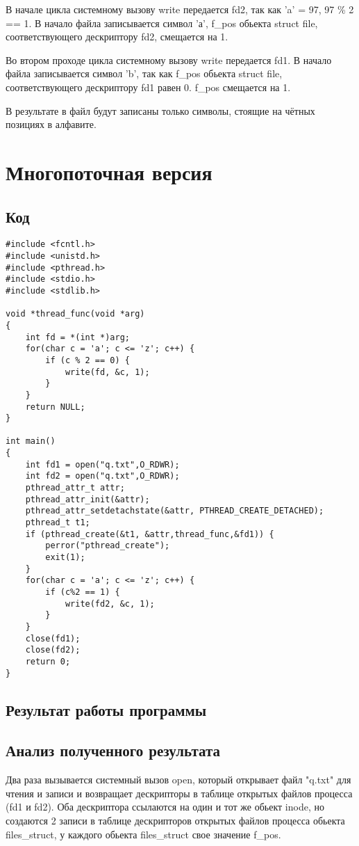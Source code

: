 В начале цикла системному вызову write передается fd2, так как 'a' = 97, 97 \% 2 == 1. В начало файла записывается символ 'а', f\_pos обьекта struct file, соответствующего дескриптору fd2, смещается на 1.

Во втором проходе цикла системному вызову write передается fd1. В начало файла записывается символ 'b', так как f\_pos обьекта struct file, соответствующего дескриптору fd1 равен 0. f\_pos смещается на 1.

В результате в файл будут записаны только символы, стоящие на чётных позициях в алфавите.

\section{Многопоточная версия}
\subsection{Код}
\begin{lstlisting}[caption={Программа 2, вариант 2, многопоточная версия}, label=lst:p22_th]
#include <fcntl.h>
#include <unistd.h>
#include <pthread.h>
#include <stdio.h>
#include <stdlib.h>

void *thread_func(void *arg)
{
	int fd = *(int *)arg;
	for(char c = 'a'; c <= 'z'; c++) {
		if (c % 2 == 0) {
			write(fd, &c, 1);
		}
	}
	return NULL;
}

int main() 
{
	int fd1 = open("q.txt",O_RDWR);
	int fd2 = open("q.txt",O_RDWR);
	pthread_attr_t attr;
	pthread_attr_init(&attr);
	pthread_attr_setdetachstate(&attr, PTHREAD_CREATE_DETACHED);
	pthread_t t1;
	if (pthread_create(&t1, &attr,thread_func,&fd1)) {
		perror("pthread_create");
		exit(1);
	}
	for(char c = 'a'; c <= 'z'; c++) {
		if (c%2 == 1) {
			write(fd2, &c, 1);
		}
	}
	close(fd1);
	close(fd2);
	return 0;
}
\end{lstlisting}

\subsection{Результат работы программы}
\FloatBarrier
{}
\FloatBarrier

\subsection{Анализ полученного результата}

Два раза вызывается системный вызов open, который открывает файл "q.txt" для чтения и записи и возвращает дескрипторы в таблице открытых файлов процесса (fd1 и fd2). Оба дескриптора ссылаются на один и тот же обьект inode, но создаются 2 записи в таблице дескрипторов открытых файлов процесса обьекта files\_struct, у каждого обьекта files\_struct свое значение f\_pos.

